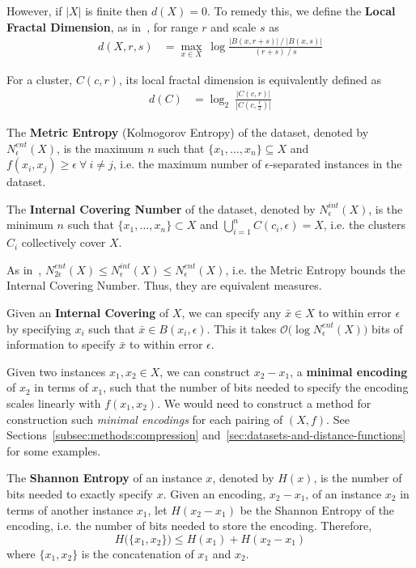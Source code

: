 However, if $|X|$ is finite then $d(X) = 0$.
To remedy this, we define the \textbf{Local Fractal Dimension}, as in~\cite{berger2020levenshtein}, for range $r$ and scale $s$ as
\begin{align*}
    d(X, r, s) &= \max_{x \in X} \ \log \frac{|B(x, r + s)| \ / \ |B(x, s)|}{(r + s) \ / \ s}
\end{align*}

For a cluster, $C(c, r)$, its local fractal dimension is equivalently defined as
\begin{align}
    \label{eq:local-fractal-dimension}
    d(C) &= \log_2 \ \frac{|C(c, r)|}{|C(c, \frac{r}{2})|}
\end{align}

The \textbf{Metric Entropy} (Kolmogorov Entropy) of the dataset, denoted by $N_{\epsilon}^{ent}(X)$, is the maximum $n$ such that $\{x_1, \dots, x_n\} \subseteq X$ and $f(x_i, x_j) \geq \epsilon \ \forall \ i \neq j$, i.e. the maximum number of $\epsilon$-separated instances in the dataset.

The \textbf{Internal Covering Number} of the dataset, denoted by $N_{\epsilon}^{int}(X)$, is the minimum $n$ such that $\{x_1, \dots, x_n\} \subset X$ and $\bigcup_{i = 1}^{n} C(c_i, \epsilon) = X$, i.e. the clusters $C_i$ collectively cover $X$.

As in~\cite{berger2020levenshtein}, $N_{2\epsilon}^{ent}(X) \leq N_{\epsilon}^{int}(X) \leq N_{\epsilon}^{ent}(X)$, i.e. the Metric Entropy bounds the Internal Covering Number.
Thus, they are equivalent measures.

Given an \textbf{Internal Covering} of $X$, we can specify any $\bar{x} \in X$ to within error $\epsilon$ by specifying $x_i$ such that $\bar{x} \in B(x_i, \epsilon)$.
This it takes $\mathcal{O} \big( \log N_{\epsilon}^{ent}(X) \big)$ bits of information to specify $\bar{x}$ to within error $\epsilon$.

Given two instances $x_1, x_2 \in X$, we can construct $x_2 - x_1$, a \textbf{minimal encoding} of $x_2$ in terms of $x_1$, such that the number of bits needed to specify the encoding scales linearly with $f(x_1, x_2)$.
We would need to construct a method for construction such \textit{minimal encodings} for each pairing of $(X, f)$.
See Sections~\ref{subsec:methods:compression} and~\ref{sec:datasets-and-distance-functions} for some examples.

The \textbf{Shannon Entropy} of an instance $x$, denoted by $H(x)$, is the number of bits needed to exactly specify $x$.
Given an encoding, $x_2 - x_1$, of an instance $x_2$ in terms of another instance $x_1$, let $H(x_2 - x_1)$ be the Shannon Entropy of the encoding, i.e. the number of bits needed to store the encoding.
Therefore, \[ H \big( \{ x_1, x_2 \} \big) \leq H(x_1) + H(x_2 - x_1) \] where $\{ x_1, x_2 \}$ is the concatenation of $x_1$ and $x_2$.

